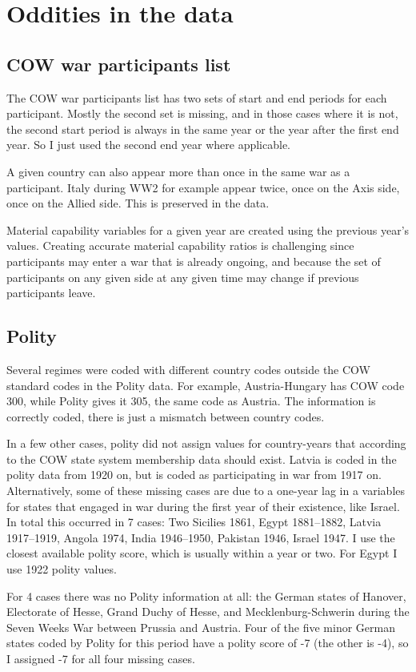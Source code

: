 \section{Oddities in the data}

\subsection{COW war participants list}

The COW war participants list has two sets of start and end periods for each participant. Mostly the second set is missing, and in those cases where it is not, the second start period is always in the same year or the year after the first end year. So I just used the second end year where applicable.

A given country can also appear more than once in the same war as a participant. Italy during WW2 for example appear twice, once on the Axis side, once on the Allied side. This is preserved in the data.

Material capability variables for a given year are created using the previous year's values. Creating accurate material capability ratios is challenging since participants may enter a war that is already ongoing, and because the set of participants on any given side at any given time may change if previous participants leave.

\subsection{Polity}

Several regimes were coded with different country codes outside the COW standard codes in the Polity data. For example, Austria-Hungary has COW code 300, while Polity gives it 305, the same code as Austria. The information is correctly coded, there is just a mismatch between country codes.

In a few other cases, polity did not assign values for country-years that according to the COW state system membership data should exist. Latvia is coded in the polity data from 1920 on, but is coded as participating in war from 1917 on. Alternatively, some of these missing cases are due to a one-year lag in a variables for states that engaged in war during the first year of their existence, like Israel. In total this occurred in 7 cases: Two Sicilies 1861, Egypt 1881--1882, Latvia 1917--1919, Angola 1974, India 1946--1950, Pakistan 1946, Israel 1947. I use the closest available polity score, which is usually within a year or two. For Egypt I use 1922 polity values.

For 4 cases there was no Polity information at all: the German states of Hanover, Electorate of Hesse, Grand Duchy of Hesse, and Mecklenburg-Schwerin during the Seven Weeks War between Prussia and Austria. Four of the five minor German states coded by Polity for this period have a polity score of -7 (the other is -4), so I assigned -7 for all four missing cases.